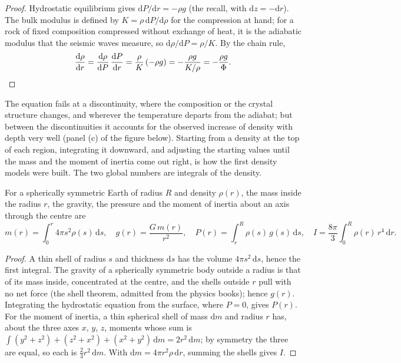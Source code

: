 \begin{proof}
Hydrostatic equilibrium gives $\mathrm dP/\mathrm dr = -\rho g$ (the recall,
with $\mathrm dz = -\mathrm dr$). The bulk modulus is defined by
$K = \rho\,\mathrm dP/\mathrm d\rho$ for the compression at hand; for a rock of
fixed composition compressed without exchange of heat, it is the adiabatic
modulus that the seismic waves measure, so $\mathrm d\rho/\mathrm dP = \rho/K$.
By the chain rule,
\[
  \frac{\mathrm d\rho}{\mathrm dr} = \frac{\mathrm d\rho}{\mathrm dP}\,
  \frac{\mathrm dP}{\mathrm dr} = \frac{\rho}{K}\,(-\rho g) = -\frac{\rho g}{K/\rho}
  = -\frac{\rho g}{\Phi}. \qedhere
\]
\end{proof}

The equation fails at a discontinuity, where the composition or the crystal
structure changes, and wherever the temperature departs from the adiabat; but
between the discontinuities it accounts for the observed increase of density
with depth very well (panel (c) of the figure below). Starting from a density at the top of each
region, integrating it downward, and adjusting the starting values until the
mass and the moment of inertia come out right, is how the first density models
were built. The two global numbers are integrals of the density.

\begin{proposition}
\label{prop:b1:layered-earth:integrals}
For a spherically symmetric Earth of radius $R$ and density $\rho(r)$, the mass
inside the radius $r$, the gravity, the pressure and the moment of inertia
about an axis through the centre are
\[
  m(r) = \int_0^r 4\pi s^2\rho(s)\,\mathrm ds, \quad
  g(r) = \frac{G\,m(r)}{r^2}, \quad
  P(r) = \int_r^R \rho(s)\,g(s)\,\mathrm ds, \quad
  I = \frac{8\pi}{3}\int_0^R \rho(r)\,r^4\,\mathrm dr.
\]
\end{proposition}

\begin{proof}
A thin shell of radius $s$ and thickness $\mathrm ds$ has the volume
$4\pi s^2\,\mathrm ds$, hence the first integral. The gravity of a spherically
symmetric body outside a radius is that of its mass inside, concentrated at the
centre, and the shells outside $r$ pull with no net force (the shell theorem,
admitted from the physics books); hence $g(r)$. Integrating the hydrostatic
equation from the surface, where $P = 0$, gives $P(r)$. For the moment of
inertia, a thin spherical shell of mass $\mathrm dm$ and radius $r$ has, about
the three axes $x$, $y$, $z$, moments whose sum is
$\int (y^2 + z^2) + (z^2 + x^2) + (x^2 + y^2)\,\mathrm dm = 2r^2\,\mathrm dm$;
by symmetry the three are equal, so each is $\tfrac23 r^2\,\mathrm dm$. With
$\mathrm dm = 4\pi r^2\rho\,\mathrm dr$, summing the shells gives $I$.
\end{proof}

